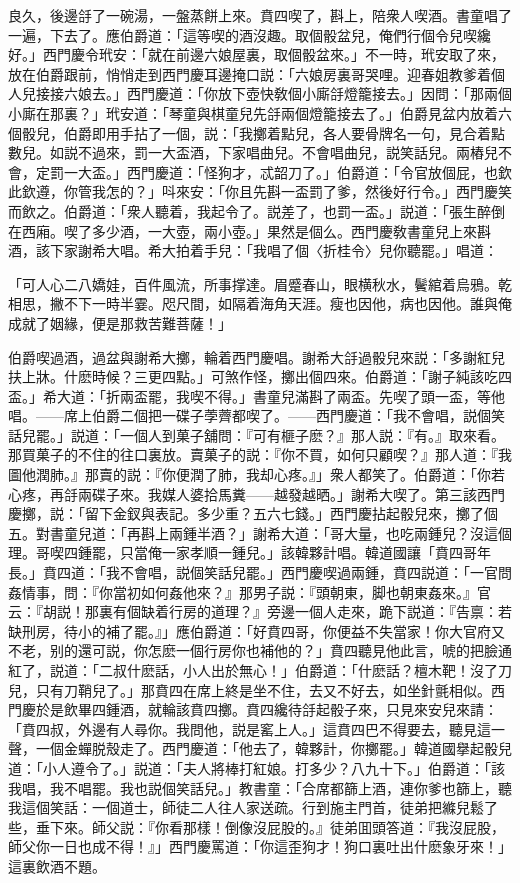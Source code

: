 良久，後邊㧱了一碗湯，一盤蒸餅上來。賁四喫了，斟上，陪衆人喫酒。書童唱了一遍，下去了。應伯爵道：「這等喫的酒沒趣。取個骰盆兒，俺們行個令兒喫纔好。」西門慶令玳安：「就在前邊六娘屋裏，取個骰盆來。」不一時，玳安取了來，放在伯爵跟前，悄悄走到西門慶耳邊掩口説：「六娘房裏哥哭哩。迎春姐教爹着個人兒接接六娘去。」西門慶道：「你放下壺快敎個小廝㧱燈籠接去。」因問：「那兩個小廝在那裏？」玳安道：「琴童與棋童兒先㧱兩個燈籠接去了。」伯爵見盆内放着六個骰兒，伯爵即用手拈了一個，説：「我擲着點兒，各人要骨牌名一句，見合着點數兒。如説不過來，罰一大盃酒，下家唱曲兒。不會唱曲兒，説笑話兒。兩樁兒不會，定罰一大盃。」西門慶道：「怪狗才，忒韶刀了。」伯爵道：「令官放個屁，也欽此欽遵，你管我怎的？」呌來安：「你且先斟一盃罰了爹，然後好行令。」西門慶笑而飲之。伯爵道：「衆人聽着，我起令了。説差了，也罰一盃。」説道：「張生醉倒在西廂。喫了多少酒，一大壺，兩小壺。」果然是個么。西門慶敎書童兒上來斟酒，該下家謝希大唱。希大拍着手兒：「我唱了個〈折桂令〉兒你聽罷。」唱道：

「可人心二八嬌娃，百件風流，所事撑達。眉蹙春山，眼横秋水，鬢綰着烏鴉。乾相思，撇不下一時半霎。咫尺間，如隔着海角天涯。瘦也因他，病也因他。誰與俺成就了姻緣，便是那救苦難菩薩！」

伯爵喫過酒，過盆與謝希大擲，輪着西門慶唱。謝希大㧱過骰兒來説：「多謝紅兒扶上牀。什麽時候？三更四點。」可煞作怪，擲出個四來。伯爵道：「謝子純該吃四盃。」希大道：「折兩盃罷，我喫不得。」書童兒滿斟了兩盃。先喫了頭一盃，等他唱。——席上伯爵二個把一碟子荸薺都喫了。——西門慶道：「我不會唱，説個笑話兒罷。」説道：「一個人到菓子舖問：『可有榧子麽？』那人説：『有。』取來看。那買菓子的不住的往口裏放。賣菓子的説：『你不買，如何只顧喫？』那人道：『我圖他潤肺。』那賣的説：『你便潤了肺，我却心疼。』」衆人都笑了。伯爵道：「你若心疼，再㧱兩碟子來。我媒人婆拾馬糞——越發越晒。」謝希大喫了。第三該西門慶擲，説：「留下金釵與表記。多少重？五六七錢。」西門慶拈起骰兒來，擲了個五。對書童兒道：「再斟上兩鍾半酒？」謝希大道：「哥大量，也吃兩鍾兒？沒這個理。哥喫四鍾罷，只當俺一家孝順一鍾兒。」該韓夥計唱。韓道國讓「賁四哥年長。」賁四道：「我不會唱，説個笑話兒罷。」西門慶喫過兩鍾，賁四説道：「一官問姦情事，問：『你當初如何姦他來？』那男子説：『頭朝東，脚也朝東姦來。』官云：『胡説！那裏有個缺着行房的道理？』旁邊一個人走來，跪下説道：『告禀：若缺刑房，待小的補了罷。』」應伯爵道：「好賁四哥，你便益不失當家！你大官府又不老，别的還可説，你怎麽一個行房你也補他的？」賁四聽見他此言，唬的把臉通紅了，説道：「二叔什麽話，小人出於無心！」伯爵道：「什麽話？檀木靶！沒了刀兒，只有刀鞘兒了。」那賁四在席上終是坐不住，去又不好去，如坐針氈相似。西門慶於是飲畢四鍾酒，就輪該賁四擲。賁四纔待㧱起骰子來，只見來安兒來請：「賁四叔，外邊有人尋你。我問他，説是窰上人。」這賁四巴不得要去，聽見這一聲，一個金蟬脱殼走了。西門慶道：「他去了，韓夥計，你擲罷。」韓道國擧起骰兒道：「小人遵令了。」説道：「夫人將棒打紅娘。打多少？八九十下。」伯爵道：「該我唱，我不唱罷。我也説個笑話兒。」教書童：「合席都篩上酒，連你爹也篩上，聽我這個笑話：一個道士，師徒二人往人家送疏。行到施主門首，徒弟把縧兒鬆了些，垂下來。師父説：『你看那樣！倒像沒屁股的。』徒弟囬頭答道：『我沒屁股，師父你一日也成不得！』」西門慶罵道：「你這歪狗才！狗口裏吐出什麽象牙來！」這裏飲酒不題。

